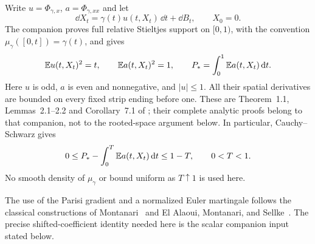Write $u=\Phi_{\gamma,x}$, $a=\Phi_{\gamma,xx}$ and let
\[
 \dd X_t=\gamma(t)u(t,X_t)\,\dd t+\dd B_t,\qquad X_0=0.
\]
The companion proves full relative Stieltjes support on $[0,1)$,
with the convention $\mu_\gamma([0,t])=\gamma(t)$, and gives
\begin{equation}
 \mathbb E u(t,X_t)^2=t,\qquad
 \mathbb E a(t,X_t)^2=1,\qquad
 P_*=\int_0^1\mathbb E a(t,X_t)\,\mathrm d t.
 \label{eq:scalar-consistency-value}
\end{equation}
Here $u$ is odd, $a$ is even and nonnegative, and $|u|\le1$.
All their spatial derivatives are bounded on every fixed strip
ending before one. These are
Theorem~1.1, Lemmas~2.1--2.2 and Corollary~7.1 of
\cite{SKSupport2026}; their complete analytic proofs belong to that
companion, not to the rooted-space argument below. In particular,
Cauchy--Schwarz gives
\begin{equation}
 0\le P_*-\int_0^T\mathbb E a(t,X_t)\,\mathrm d t\le1-T,
 \qquad 0<T<1.
 \label{eq:scalar-terminal-loss}
\end{equation}
No smooth density of $\mu_\gamma$ or bound uniform as $T\uparrow1$
is used here.

The use of the Parisi gradient and a normalized Euler martingale
follows the classical constructions of
Montanari~\cite[Section~3.1]{Montanari2019} and El Alaoui,
Montanari, and Sellke~\cite[Proposition~5.3]{AMS2020}.
The precise shifted-coefficient identity needed here is the scalar
companion input stated below.

